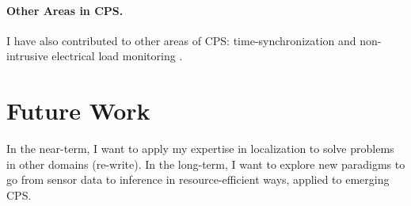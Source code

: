 \documentclass[10pt]{article}
\begin{document}

\paragraph{Other Areas in CPS. }
I have also contributed to other areas of CPS:
time-synchronization \cite{buevich2013hardware, dongare2017pulsar} and non-intrusive electrical load
monitoring \cite{rajagopal2013magnetic, rajagopal2013demo}.

\section{Future Work}
In the near-term, I want to apply my expertise in localization to solve problems in other domains (re-write).   
In the long-term, I want to explore new paradigms to go from sensor data to inference in resource-efficient ways, applied to emerging CPS.
\end{document}
